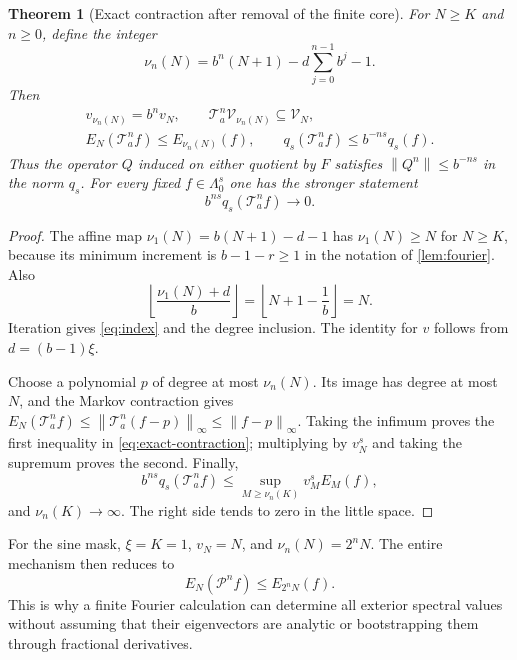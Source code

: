 \documentclass[11pt,a4paper]{article}
\numberwithin{equation}{section}
\newtheorem{theorem}{Theorem}[section]
\theoremstyle{definition}
\theoremstyle{remark}
\newcommand{\Pp}{\mathcal P}
\newcommand{\Ta}{\mathcal T_a}
\newcommand{\V}{\mathcal V}
\newcommand{\norm}[1]{\left\lVert#1\right\rVert}
\newcommand{\smallspace}{\Lambda_0}
\begin{document}
\begin{theorem}[Exact contraction after removal of the finite core]
\label{thm:quotient}
For $N\ge K$ and $n\ge0$, define the integer
\begin{equation}
 \nu_n(N)=b^n(N+1)-d\sum_{j=0}^{n-1}b^j-1.
 \label{eq:index}
\end{equation}
Then
\begin{gather}
 v_{\nu_n(N)}=b^n v_N,\qquad
 \Ta^n\V_{\nu_n(N)}\subseteq\V_N,\label{eq:index-properties}\\
 E_N(\Ta^n f)\le E_{\nu_n(N)}(f),\qquad
 q_s(\Ta^n f)\le b^{-ns}q_s(f).
 \label{eq:exact-contraction}
\end{gather}
Thus the operator $Q$ induced on either quotient by $F$ satisfies
$\norm{Q^n}\le b^{-ns}$ in the norm $q_s$.
For every fixed $f\in\smallspace^s$ one has the stronger statement
\begin{equation}
 b^{ns}q_s(\Ta^n f)\longrightarrow0.
 \label{eq:little-strong}
\end{equation}
\end{theorem}
\begin{proof}
The affine map $\nu_1(N)=b(N+1)-d-1$ has $\nu_1(N)\ge N$ for
$N\ge K$, because its minimum increment is $b-1-r\ge1$ in the
notation of \cref{lem:fourier}. Also
\[
 \left\lfloor\frac{\nu_1(N)+d}{b}\right\rfloor
 =\left\lfloor N+1-\frac1b\right\rfloor=N.
\]
Iteration gives \eqref{eq:index} and the degree inclusion. The identity
for $v$ follows from $d=(b-1)\xi$.

Choose a polynomial $p$ of degree at most $\nu_n(N)$. Its image has
degree at most $N$, and the Markov contraction gives
$E_N(\Ta^n f)\le\norm{\Ta^n(f-p)}_\infty\le\norm{f-p}_\infty$.
Taking the infimum proves the first inequality in
\eqref{eq:exact-contraction}; multiplying by $v_N^s$ and taking the
supremum proves the second. Finally,
\[
 b^{ns}q_s(\Ta^n f)
 \le\sup_{M\ge\nu_n(K)}v_M^sE_M(f),
\]
and $\nu_n(K)\to\infty$. The right side tends to zero in the little
space.
\end{proof}

For the sine mask, $\xi=K=1$, $v_N=N$, and $\nu_n(N)=2^nN$.
The entire mechanism then reduces to
\begin{equation}
 \boxed{\ E_N(\Pp^n f)\le E_{2^nN}(f).\ }
 \label{eq:sine-contraction}
\end{equation}
This is why a finite Fourier calculation can determine all exterior
spectral values without assuming that their eigenvectors are analytic or
bootstrapping them through fractional derivatives.
\end{document}

